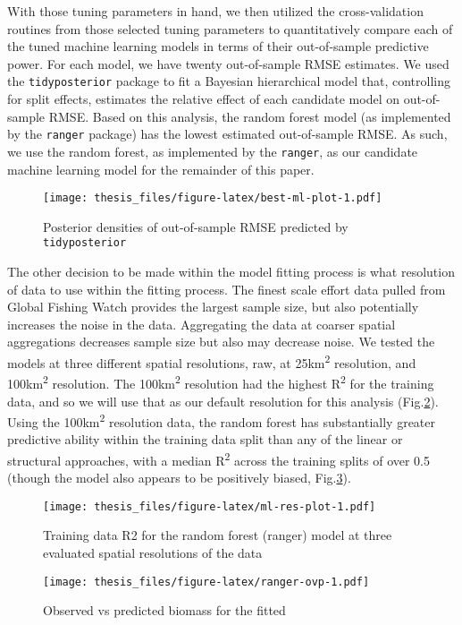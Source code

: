 \documentclass[twoside,12pt,final]{ucthesis-CA2012}
\begin{document}
\begin{ucmainmatter}
With those tuning parameters in hand, we then utilized the
cross-validation routines from those selected tuning parameters to
quantitatively compare each of the tuned machine learning models in
terms of their out-of-sample predictive power. For each model, we have
twenty out-of-sample RMSE estimates. We used the \texttt{tidyposterior}
package to fit a Bayesian hierarchical model that, controlling for split
effects, estimates the relative effect of each candidate model on
out-of-sample RMSE. Based on this analysis, the random forest model (as
implemented by the \texttt{ranger} package) has the lowest estimated
out-of-sample RMSE. As such, we use the random forest, as implemented by
the \texttt{ranger}, as our candidate machine learning model for the
remainder of this paper.
\begin{figure}
\centering
\texttt{[image: thesis\_files/figure-latex/best-ml-plot-1.pdf]}
\caption{\label{fig:best-ml-plot}Posterior densities of out-of-sample RMSE
predicted by \texttt{tidyposterior}}
\end{figure}
The other decision to be made within the model fitting process is what
resolution of data to use within the fitting process. The finest scale
effort data pulled from Global Fishing Watch provides the largest sample
size, but also potentially increases the noise in the data. Aggregating
the data at coarser spatial aggregations decreases sample size but also
may decrease noise. We tested the models at three different spatial
resolutions, raw, at 25km\textsuperscript{2} resolution, and
100km\textsuperscript{2} resolution. The 100km\textsuperscript{2}
resolution had the highest R\textsuperscript{2} for the training data,
and so we will use that as our default resolution for this analysis
(Fig.\ref{fig:ml-res-plot}). Using the 100km\textsuperscript{2}
resolution data, the random forest has substantially greater predictive
ability within the training data split than any of the linear or
structural approaches, with a median R\textsuperscript{2} across the
training splits of over 0.5 (though the model also appears to be
positively biased, Fig.\ref{fig:ranger-ovp}).
\begin{figure}
\centering
\texttt{[image: thesis\_files/figure-latex/ml-res-plot-1.pdf]}
\caption{\label{fig:ml-res-plot}Training data R2 for the random forest
(ranger) model at three evaluated spatial resolutions of the data}
\end{figure}
\begin{figure}
\centering
\texttt{[image: thesis\_files/figure-latex/ranger-ovp-1.pdf]}
\caption{\label{fig:ranger-ovp}Observed vs predicted biomass for the fitted
}
\end{figure}
\end{ucmainmatter}
\end{document}
